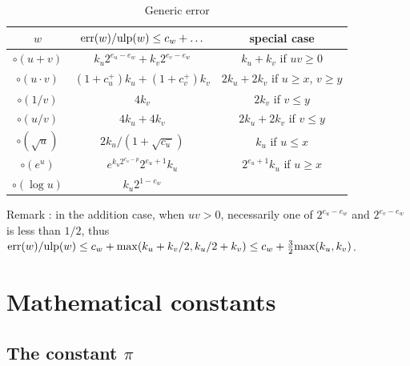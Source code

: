 \documentclass[12pt]{amsart}
\def\ulp{{\rm ulp}}
\def\err{{\rm err}}
\begin{document}
\begin{table}[ht]
\begin{center}
\begin{tabular}{|c|c|c|} \hline
   $w$        & $\err(w)/\ulp(w) \le c_w + \ldots$ &special case\\ \hline\hline
$\circ(u+v)$ & $k_u 2^{e_u-e_w} + k_v 2^{e_v-e_w}$ & $k_u + k_v$ if $u v \ge 0$\\
$\circ(u \cdot v)$ & $(1+c^{+}_u)k_u + (1+c^{+}_v)k_v$ & $2k_u + 2k_v$ if $u \ge x$, $v \ge y$\\
$\circ(1/v)$ & $4 k_v$ & $2 k_v$ if $v \le y$ \\
$\circ(u/v)$ & $4 k_u + 4 k_v$ & $2 k_u + 2 k_v$ if $v \le y$ \\
$\circ(\sqrt{u})$ & $2 k_u/(1+\sqrt{c^{-}_u})$ & $k_u$ if $u \le x$ \\
$\circ(e^u)$ & $e^{k_u 2^{e_u-p}} 2^{e_u+1} k_u$ & $2^{e_u+1} k_u$ if $u \ge x$ \\
$\circ(\log u)$ & $k_u 2^{1-e_w}$ & \\
\hline
\end{tabular}
\end{center}
\caption{Generic error}
\label{table:genericError}
\end{table}
Remark : in the addition case, when $u v > 0$,
necessarily one of $2^{e_u-e_w}$ and $2^{e_v-e_w}$ is less than $1/2$,
thus $\err(w)/\ulp(w) \le c_w + {\rm max}(k_u + k_v/2, k_u/2 + k_v)
        \le c_w + \frac{3}{2} {\rm max}(k_u, k_v)$.

\section{Mathematical constants}

\subsection{The constant $\pi$}
\end{document}
